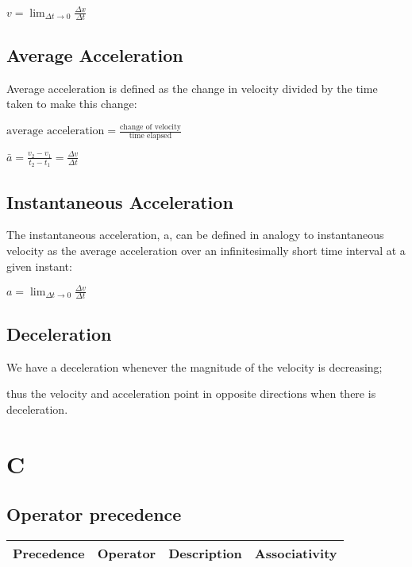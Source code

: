 \documentclass{extarticle}
\begin{document}
\begin{multicols}{4}
$v = \lim_{\Delta t \to 0} \frac{\Delta x}{\Delta t}$

\subsection{Average Acceleration}
Average acceleration is defined as the change in velocity divided by the time taken to make this change:

$\text{average acceleration} = \frac{\text{change of velocity}}{\text{time elapsed}}$

$\bar{a} = \frac{v_2 - v_1}{t_2 - t_1} = \frac{\Delta v}{\Delta t}$

\subsection{Instantaneous Acceleration}
The instantaneous acceleration, a, can be defined in analogy to instantaneous
velocity as the average acceleration over an infinitesimally short time interval at
a given instant:

$a = \lim_{\Delta t \to 0} \frac{\Delta v}{\Delta t}$


\subsection{Deceleration}
We have a deceleration whenever the magnitude of the velocity is decreasing;

thus the velocity and acceleration point in opposite directions when there is deceleration.


















\section{C}

\subsection{Operator precedence}

\begin{tabular}{|l|l|l|l|}
\hline
Precedence     & Operator                                              & Description                                                            & Associativity \\ \hline
\end{tabular}



\end{multicols}
\end{document}
